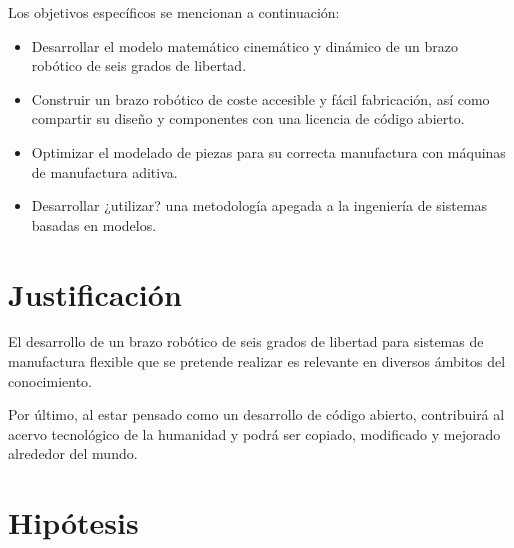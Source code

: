 Los objetivos específicos se mencionan a continuación:

\begin{itemize}
\item Desarrollar el modelo matemático cinemático y dinámico de un brazo robótico de seis grados de libertad.
\item Construir un brazo robótico de coste accesible y fácil fabricación, así como compartir su diseño y componentes con una licencia de código abierto. 
\item Optimizar el modelado de piezas para su correcta manufactura con máquinas de manufactura aditiva.
\item Desarrollar ¿utilizar? una metodología apegada a la ingeniería de sistemas basadas en modelos.
\end{itemize}

\section{Justificación}

El desarrollo de un brazo robótico de seis grados de libertad para sistemas de manufactura flexible que se pretende realizar es relevante en diversos ámbitos del conocimiento. 

Por último, al estar pensado como un desarrollo de código abierto, contribuirá al acervo tecnológico de la humanidad y podrá ser copiado, modificado y mejorado alrededor del mundo. 


\section{Hipótesis}

